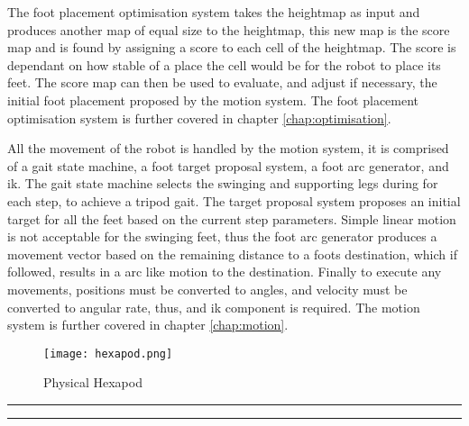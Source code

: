 The foot placement optimisation system takes the heightmap as input and produces another map of equal size to the heightmap, this new map is the score map and is found by assigning a score to each
cell of the heightmap. The score is dependant on how stable of a place the cell would be for the robot to place its feet. The score map can then be used to evaluate, and adjust if necessary, the
initial foot placement proposed by the motion system. The foot placement optimisation system is further covered in chapter \ref{chap:optimisation}.

All the movement of the robot is handled by the motion system, it is comprised of a gait state machine, a foot target proposal system, a foot arc generator, and \ac{ik}.
The gait state machine selects the swinging and supporting legs during for each step, to achieve a tripod gait. The target proposal system proposes an initial target for all the feet based
on the current step parameters. Simple linear motion is not acceptable for the swinging feet, thus the foot arc generator produces a movement vector based on the remaining distance to a foots destination,
which if followed, results in a arc like motion to the destination. Finally to execute any movements, positions must be converted to angles, and velocity must be converted to
angular rate, thus, and \ac{ik} component is required. The motion system is further covered in chapter \ref{chap:motion}.

\begin{figure}[h]
    \centering
    \texttt{[image: hexapod.png]}
    \caption{Physical Hexapod}
    \label{fig:hexapod}
\end{figure}


\bigskip
\bigskip
\hrule
\smallbreak
\hrule
